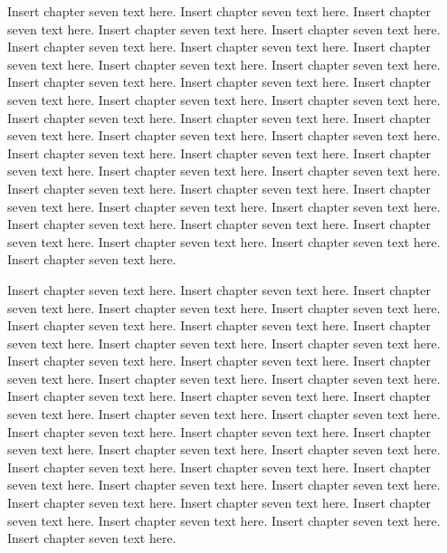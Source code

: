 Insert chapter seven text here. Insert chapter seven text here. Insert chapter seven text here. Insert chapter seven text here. Insert chapter seven text here. Insert chapter seven text here. Insert chapter seven text here. Insert chapter seven text here. Insert chapter seven text here. Insert chapter seven text here. Insert chapter seven text here. Insert chapter seven text here. Insert chapter seven text here. Insert chapter seven text here. Insert chapter seven text here. Insert chapter seven text here. Insert chapter seven text here. Insert chapter seven text here. Insert chapter seven text here. Insert chapter seven text here. Insert chapter seven text here. Insert chapter seven text here. Insert chapter seven text here. Insert chapter seven text here. Insert chapter seven text here. Insert chapter seven text here. Insert chapter seven text here. Insert chapter seven text here. Insert chapter seven text here. Insert chapter seven text here. Insert chapter seven text here. Insert chapter seven text here. Insert chapter seven text here. Insert chapter seven text here. Insert chapter seven text here. Insert chapter seven text here.

Insert chapter seven text here. Insert chapter seven text here. Insert chapter seven text here. Insert chapter seven text here. Insert chapter seven text here. Insert chapter seven text here. Insert chapter seven text here. Insert chapter seven text here. Insert chapter seven text here. Insert chapter seven text here. Insert chapter seven text here. Insert chapter seven text here. Insert chapter seven text here. Insert chapter seven text here. Insert chapter seven text here. Insert chapter seven text here. Insert chapter seven text here. Insert chapter seven text here. Insert chapter seven text here. Insert chapter seven text here. Insert chapter seven text here. Insert chapter seven text here. Insert chapter seven text here. Insert chapter seven text here. Insert chapter seven text here. Insert chapter seven text here. Insert chapter seven text here. Insert chapter seven text here. Insert chapter seven text here. Insert chapter seven text here. Insert chapter seven text here. Insert chapter seven text here. Insert chapter seven text here. Insert chapter seven text here. Insert chapter seven text here. Insert chapter seven text here.

